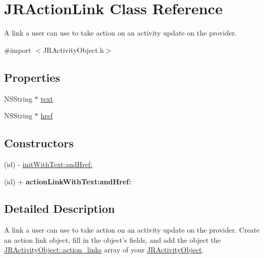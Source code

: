 \hypertarget{interface_j_r_action_link}{
\section{JRActionLink Class Reference}
\label{interface_j_r_action_link}
}


A link a user can use to take action on an activity update on the provider.  




{\ttfamily \#import $<$JRActivityObject.h$>$}

\subsection*{Properties}
\begin{DoxyCompactItemize}
\item 
NSString $\ast$ \hyperlink{interface_j_r_action_link_a062c02005f1c35e651ffbcab51c50b21}{text}
\item 
NSString $\ast$ \hyperlink{interface_j_r_action_link_a45489781731e5965e20fa66af0bd3072}{href}
\end{DoxyCompactItemize}
\subsection*{Constructors}
\label{_amgrp559a25fdb98a7d1fd1c3771ac568d5e9}
 \begin{DoxyCompactItemize}
\item 
(id) -\/ \hyperlink{interface_j_r_action_link_ae1f056641fd3302efbf23d89452553a5}{initWithText:andHref:}
\item 
\hypertarget{interface_j_r_action_link_a210a41749ddf22e6ce0a7b797fac2f3f}{
(id) + {\bfseries actionLinkWithText:andHref:}}
\label{interface_j_r_action_link_a210a41749ddf22e6ce0a7b797fac2f3f}

\end{DoxyCompactItemize}


\subsection{Detailed Description}
A link a user can use to take action on an activity update on the provider. Create an action link object, fill in the object's fields, and add the object the \hyperlink{interface_j_r_activity_object_aa5c629e1c3b8306b2532ab647f7f6ec5}{JRActivityObject::action\_\-links} array of your \hyperlink{interface_j_r_activity_object}{JRActivityObject}.

